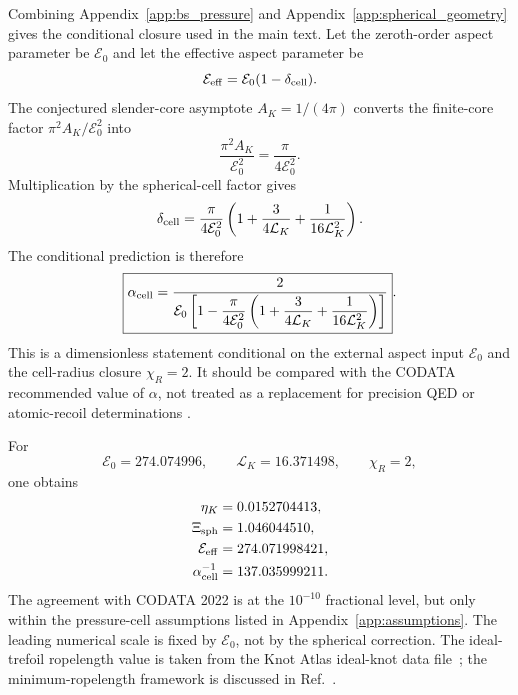 \documentclass[aps,pra,preprint,longbibliography,nofootinbib]{revtex4-2}
\begin{document}
Combining Appendix~\ref{app:bs_pressure} and
Appendix~\ref{app:spherical_geometry} gives the conditional closure used in
the main text.  Let the zeroth-order aspect parameter be $\mathcal E_0$ and
let the effective aspect parameter be
\begin{equation}
  \mathcal E_{\rm eff}=\mathcal E_0(1-\delta_{\rm cell}) .
  \label{eq:app_E_eff_def}
\end{equation}
The conjectured slender-core asymptote $A_K=1/(4\pi)$ converts the finite-core
factor $\pi^2A_K/\mathcal E_0^2$ into
\begin{equation}
  \frac{\pi^2A_K}{\mathcal E_0^2}=\frac{\pi}{4\mathcal E_0^2} .
  \label{eq:app_pi_over_four}
\end{equation}
Multiplication by the spherical-cell factor gives
\begin{equation}
  \delta_{\rm cell}
  =\frac{\pi}{4\mathcal E_0^2}
   \left(1+\frac{3}{4\mathcal L_K}+\frac{1}{16\mathcal L_K^2}\right).
  \label{eq:app_delta_cell}
\end{equation}
The conditional prediction is therefore
\begin{equation}
  \boxed{\alpha_{\rm cell}
  =\frac{2}{\mathcal E_0\left[1-
  \dfrac{\pi}{4\mathcal E_0^2}\left(1+\dfrac{3}{4\mathcal L_K}
  +\dfrac{1}{16\mathcal L_K^2}\right)\right]}} .
  \label{eq:app_alpha_cell}
\end{equation}
This is a dimensionless statement conditional on the external aspect input
$\mathcal E_0$ and the cell-radius closure $\chi_R=2$.  It should be
compared with the CODATA recommended value of $\alpha$, not treated as a
replacement for precision QED or atomic-recoil determinations
\cite{MohrTaylor2022,Karshenboim2005}.

For
\begin{equation}
  \mathcal E_0=274.074996,
  \qquad
  \mathcal L_K=16.371498,
  \qquad
  \chi_R=2,
  \label{eq:app_numerical_inputs}
\end{equation}
one obtains
\begin{align}
  \eta_K &= 0.0152704413,\nonumber\\
  \Xi_{\rm sph} &= 1.046044510,\nonumber\\
  \mathcal E_{\rm eff} &= 274.071998421,\nonumber\\
  \alpha_{\rm cell}^{-1} &= 137.035999211 .
  \label{eq:app_numerical_alpha}
\end{align}
The agreement with CODATA 2022 is at the $10^{-10}$ fractional level, but
only within the pressure-cell assumptions listed in
Appendix~\ref{app:assumptions}.  The leading numerical scale is fixed by
$\mathcal E_0$, not by the spherical correction.  The ideal-trefoil
ropelength value is taken from the Knot Atlas ideal-knot data
file~\cite{KnotAtlasIdeal}; the minimum-ropelength framework is discussed
in Ref.~\cite{Cantarella2002}.
\end{document}
